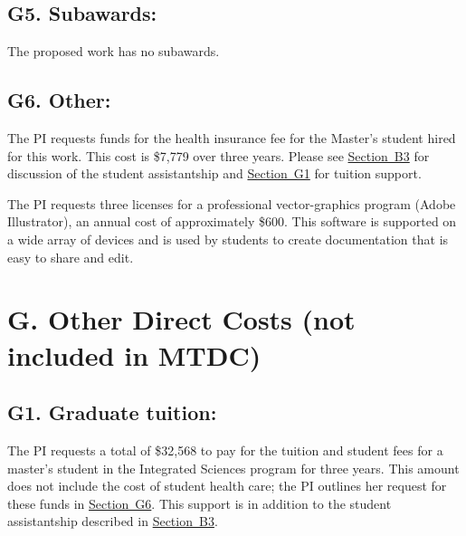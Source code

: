 \documentclass[11pt,oneside]{memoir}
\begin{document}
\subsection*{G5. Subawards:}
The proposed work has no subawards.

\subsection*{G6. Other:}
\label{sec:masters-health}
The PI requests funds for the health insurance fee for the Master's student hired for this work.  This cost is \$7,779 over three years.  Please see \hyperref[sec:masters-student-salary]{Section~B3} for discussion of the student assistantship and \hyperref[sec:masters-tuition]{Section~G1} for tuition support.

The PI requests three licenses for a professional vector-graphics program (Adobe Illustrator), an annual cost of approximately \$600. This software is supported on a wide array of devices and is used by students to create documentation that is easy to share and edit.



\section*{G. Other Direct Costs (not included in MTDC)}
%

\subsection{G1. Graduate tuition:}
\label{sec:masters-tuition}
The PI requests a total of \$32,568 to pay for the tuition and student fees for a master's student in the Integrated Sciences program for three years.  This amount does not include the cost of student health care; the PI outlines her request for these funds in \hyperref[sec:masters-health]{Section~G6}. This support is in addition to the student assistantship described in 
\hyperref[sec:masters-student-salary]{Section~B3}.
\end{document}

